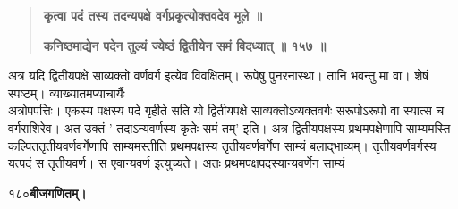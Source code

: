 \documentclass[11pt, openany]{book}
\begin{document}
\begin{sloppypar}
\begin{quote}
\hspace{1in}\textbf{कृत्वा पदं तस्य तदन्यपक्षे वर्गप्रकृत्योक्तवदेव मूले ॥}

\hspace{1in}\textbf{कनिष्ठमाद्येन पदेन तुल्यं ज्येष्ठं द्वितीयेन समं विदध्यात् ॥ १५७ ॥}
\end{quote}

\hangindent=0.2in \hspace{0.2in}अत्र यदि द्वितीयपक्षे साव्यक्तो वर्णवर्ग इत्येव विवक्षितम्। रूपेषु पुनरनास्था। तानि भवन्तु मा वा। शेषं स्पष्टम्। व्याख्यातमप्याचार्यैः। \\

\hangindent=0.2in \hspace{0.2in}अत्रोपपत्तिः। एकस्य पक्षस्य पदे गृहीते सति यो द्वितीयपक्षे साव्यक्तोऽव्यक्तवर्गः सरूपोऽरूपो वा स्यात्स च वर्गराशिरेव। अत उक्तं ' तदाऽन्यवर्णस्य कृतेः समं तम्' इति। अत्र द्वितीयपक्षस्य प्रथमपक्षेणापि साम्यमस्ति कल्पिततृतीयवर्णवर्गेणापि साम्यमस्तीति प्रथमपक्षस्य तृतीयवर्णवर्गेण साम्यं बलाद्भाव्यम्। तृतीयवर्णवर्गस्य यत्पदं स तृतीयवर्ण। स एवान्यवर्ण इत्युच्यते। अतः प्रथमपक्षपदस्यान्यवर्णेन साम्यं
\end{sloppypar}
\thispagestyle{empty}
\newpage

\onehalfspacing
१८०\hspace{2in}\textbf{बीजगणितम्।} 

\vspace{5mm}
\end{document}
